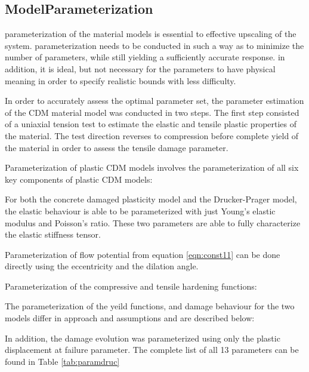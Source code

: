 \subsection{ModelParameterization}
parameterization of the material models is essential to effective upscaling of the system. parameterization needs to be conducted in such a way as to minimize the number of parameters, while still yielding a sufficiently accurate response. in addition, it is ideal, but not necessary for the parameters to have physical meaning in order to specify realistic bounds with less difficulty.

In order to accurately assess the optimal parameter set, the parameter estimation of the CDM material model was conducted in two steps. The first step consisted of a uniaxial tension test to estimate the elastic and tensile plastic properties of the material. The test direction reverses to compression before complete yield of the material in order to assess the tensile damage parameter. 

Parameterization of plastic CDM models involves the parameterization of all six key components of plastic CDM models:

For both the concrete damaged plasticity model and the Drucker-Prager model, the elastic behaviour is able to be parameterized with just Young's elastic modulus and Poisson's ratio. These two parameters are able to fully characterize the elastic stiffness tensor.

Parameterization of flow potential from equation \ref{eqn:const11} can be done directly using the eccentricity and the dilation angle.

Parameterization of the compressive and tensile hardening functions:

The parameterization of the yeild functions, and damage behaviour for the two models differ in approach and assumptions and are described below:





In addition, the damage evolution was parameterized using only the plastic displacement at failure parameter. The complete list of all 13 parameters can be found in Table \ref{tab:paramdruc}

